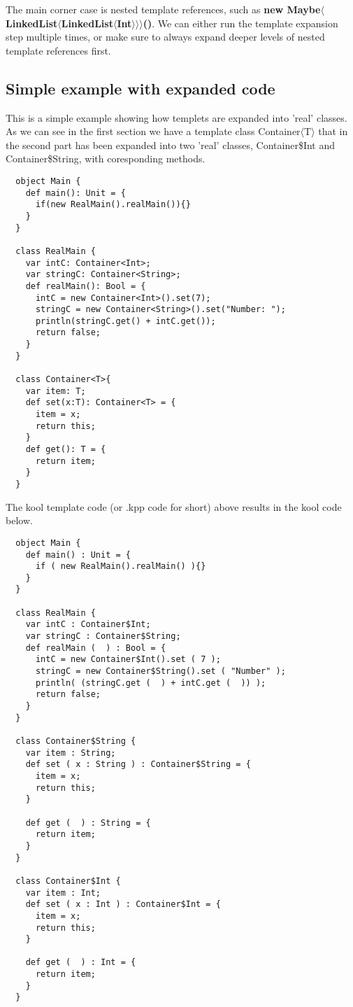 The main corner case is nested template references, such as \textbf{new
Maybe$\langle$LinkedList$\langle$LinkedList$\langle$Int$\rangle\rangle\rangle$()}.
We can either run the template expansion step multiple times, or make sure to
always expand deeper levels of nested template references first.


\subsection{Simple example with expanded code}
This is a simple example showing how templets are expanded into
'real' classes. As we can see in the first section we have a template class
Container$\langle$T$\rangle$ that in the second part has been expanded into
two 'real' classes, Container\$Int and Container\$String, with coresponding
methods.

\begin{lstlisting}
  object Main {
    def main(): Unit = {
      if(new RealMain().realMain()){}
    }
  }

  class RealMain {
    var intC: Container<Int>;
    var stringC: Container<String>;
    def realMain(): Bool = {
      intC = new Container<Int>().set(7);
      stringC = new Container<String>().set("Number: ");
      println(stringC.get() + intC.get());
      return false;
    }
  }

  class Container<T>{
    var item: T;
    def set(x:T): Container<T> = {
      item = x;
      return this;
    }
    def get(): T = {
      return item;
    }
  }

\end{lstlisting}

The kool template code (or .kpp code for short) above results in the
kool code below.

\begin{lstlisting}
  object Main {
    def main() : Unit = {
      if ( new RealMain().realMain() ){}
    }
  }

  class RealMain {
    var intC : Container$Int;
    var stringC : Container$String;
    def realMain (  ) : Bool = {
      intC = new Container$Int().set ( 7 );
      stringC = new Container$String().set ( "Number" );
      println( (stringC.get (  ) + intC.get (  )) );
      return false;
    }
  }

  class Container$String {
    var item : String;
    def set ( x : String ) : Container$String = {
      item = x;
      return this;
    }

    def get (  ) : String = {
      return item;
    }
  }

  class Container$Int {
    var item : Int;
    def set ( x : Int ) : Container$Int = {
      item = x;
      return this;
    }

    def get (  ) : Int = {
      return item;
    }
  }

\end{lstlisting}
